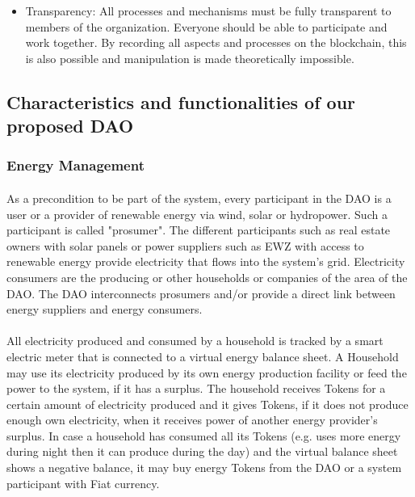 \documentclass{scrartcl}
\begin{document}
\begin{itemize}
    	\item Transparency: \newline
    	All processes and mechanisms must be fully transparent to members of the organization. Everyone should be able to participate and work together. By recording all aspects and processes on the blockchain, this is also possible and manipulation is made theoretically impossible.
    \end{itemize}

	\subsection{Characteristics and functionalities of our proposed DAO}
	
	\subsubsection{Energy Management}
	
	\paragraph{}
	As a precondition to be part of the system, every participant in the DAO is a user or a provider of renewable energy via wind, solar or hydropower. Such a participant is called "prosumer". The different participants such as real estate owners with solar panels or power suppliers such as EWZ with access to renewable energy provide electricity that flows into the system's grid. Electricity consumers are the producing or other households or companies of the area of the DAO. The DAO interconnects prosumers and/or provide a direct link between energy suppliers and energy consumers.
	
	\paragraph{}
	All electricity produced and consumed by a household is tracked by a smart electric meter that is connected to a virtual energy balance sheet.  A Household may use its electricity produced by its own energy production facility or feed the power to the system, if it has a surplus. The household receives Tokens for a certain amount of electricity produced and it gives Tokens, if it does not produce enough own electricity, when it receives power of another energy provider's surplus. In case a household has consumed all its Tokens (e.g. uses more energy during night then it can produce during the day) and the virtual balance sheet shows a negative balance, it may buy energy Tokens from the DAO or a system participant with Fiat currency.
	
\end{document}
